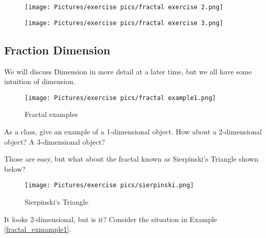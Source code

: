 \vspace{2in}

\begin{exercise}
\end{exercise}
\begin{figure}[h]
    \centering
    \texttt{[image: Pictures/exercise pics/fractal exercise 2.png]}
    \label{fig:fractalex2}
\end{figure}


\newpage

\begin{exercise}
\end{exercise}
\begin{figure}[h]
    \centering
    \texttt{[image: Pictures/exercise pics/fractal exercise 3.png]}
    \label{fig:fractalex3}
\end{figure}

\vspace{2in}

\subsection{Fraction Dimension}

We will discuss Dimension in more detail at a later time, but we all have some intuition of dimension.

\begin{figure}[h]
    \centering
    \texttt{[image: Pictures/exercise pics/fractal example1.png]}
    \caption{Fractal examples}
    \label{fig:fractal1}
\end{figure}

\begin{exercise}
As a class, give an example of a 1-dimensional object. How about a 2-dimensional object? A 3-dimensional object?
\end{exercise}

\noindent Those are easy, but what about the fractal known as Sierpinski's Triangle shown below?

\begin{figure}[h]
    \centering
    \texttt{[image: Pictures/exercise pics/sierpinski.png]}
    \caption{Sierpinski`s Triangle}
    \label{fig:sierpinski}
\end{figure}

\noindent It looks 2-dimensional, but is it? Consider the situation in Example \ref{fractal_exmample1}. 

